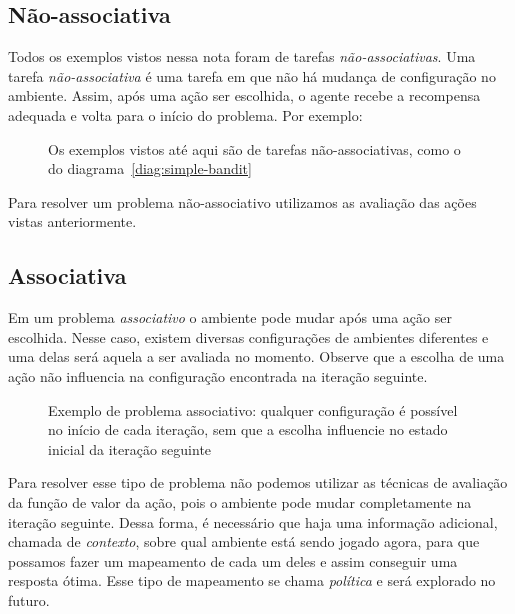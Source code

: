 \documentclass{article}
\begin{document}
        \subsection{Não-associativa}
            
            Todos os exemplos vistos nessa nota foram de tarefas \emph{não-associativas}. Uma tarefa \emph{não-associativa} é uma tarefa em que não há mudança de configuração no ambiente. Assim, após uma ação ser escolhida, o agente recebe a recompensa adequada e volta para o início do problema. Por exemplo:            
            
            \begin{figure}[ht]
                \centering
                \simplebandit
                \caption{Os exemplos vistos até aqui são de tarefas não-associativas, como o do diagrama~\ref{diag:simple-bandit}}
                \label{diag:non-associative}
            \end{figure}
            
            Para resolver um problema não-associativo utilizamos as avaliação das ações vistas anteriormente.
    
        \subsection{Associativa}
        
            Em um problema \emph{associativo} o ambiente pode mudar após uma ação ser escolhida. Nesse caso, existem diversas configurações de ambientes diferentes e uma delas será aquela a ser avaliada no momento. Observe que a escolha de uma ação não influencia na configuração encontrada na iteração seguinte.
    
            \begin{figure}
                \centering
                \associativebandits
                \caption{Exemplo de problema associativo: qualquer configuração é possível no início de cada iteração, sem que a escolha influencie no estado inicial da iteração seguinte}
                \label{fig:my_label}
            \end{figure}
            
            Para resolver esse tipo de problema não podemos utilizar as técnicas de avaliação da função de valor da ação, pois o ambiente pode mudar completamente na iteração seguinte. Dessa forma, é necessário que haja uma informação adicional, chamada de \emph{contexto}, sobre qual ambiente está sendo jogado agora, para que possamos fazer um mapeamento de cada um deles e assim conseguir uma resposta ótima. Esse tipo de mapeamento se chama \emph{política} e será explorado no futuro.
\end{document}
